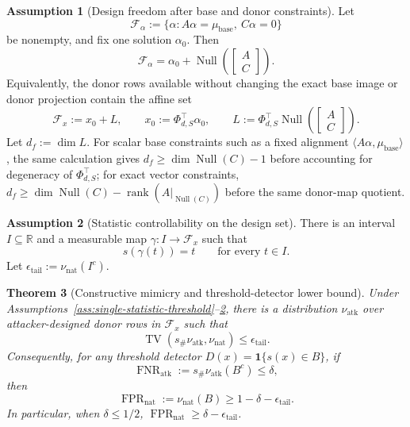 \documentclass{article}
\theoremstyle{plain}
\newtheorem{theorem}{Theorem}[section]
\theoremstyle{definition}
\newtheorem{assumption}[theorem]{Assumption}
\theoremstyle{remark}
\begin{document}
\begin{assumption}[Design freedom after base and donor constraints]
\label{ass:detector-design-freedom}
Let
\[
\mathcal{F}_{\alpha}
:=
\{\alpha:A\alpha=\mu_{\text{base}},\ C\alpha=0\}
\]
be nonempty, and fix one solution $\alpha_0$. Then
\[
\mathcal{F}_{\alpha}=\alpha_0+\operatorname{Null}\left(\begin{bmatrix}A\\ C\end{bmatrix}\right).
\]
Equivalently, the donor rows available without changing the exact base image or donor projection contain the affine set
\[
\mathcal{F}_{x}
:=
x_0+L,
\qquad
x_0:=\Phi_{d,S}^\top\alpha_0,
\qquad
L:=\Phi_{d,S}^\top\operatorname{Null}\left(\begin{bmatrix}A\\ C\end{bmatrix}\right).
\]
Let $d_f:=\dim L$. For scalar base constraints such as a fixed alignment $\langle A\alpha,\mu_{\text{base}}\rangle$, the same calculation gives $d_f\ge \dim\operatorname{Null}(C)-1$ before accounting for degeneracy of $\Phi_{d,S}^\top$; for exact vector constraints, $d_f\ge \dim\operatorname{Null}(C)-\operatorname{rank}(A|_{\operatorname{Null}(C)})$ before the same donor-map quotient.
\end{assumption}

\begin{assumption}[Statistic controllability on the design set]
\label{ass:statistic-controllability}
There is an interval $I\subseteq\mathbb{R}$ and a measurable map $\gamma:I\to\mathcal{F}_x$ such that
\[
s(\gamma(t))=t
\qquad
\text{for every }t\in I.
\]
Let $\epsilon_{\mathrm{tail}}:=\nu_{\mathrm{nat}}(I^c)$.
\end{assumption}

\begin{theorem}[Constructive mimicry and threshold-detector lower bound]
\label{thm:spectral-threshold-lower-bound}
Under Assumptions~\ref{ass:single-statistic-threshold}--\ref{ass:statistic-controllability}, there is a distribution $\nu_{\mathrm{atk}}$ over attacker-designed donor rows in $\mathcal{F}_x$ such that
\[
\operatorname{TV}\left(s_\#\nu_{\mathrm{atk}},\nu_{\mathrm{nat}}\right)
\le
\epsilon_{\mathrm{tail}}.
\]
Consequently, for any threshold detector $D(x)=\mathbf{1}\{s(x)\in B\}$, if
\[
\operatorname{FNR}_{\mathrm{atk}}:=s_\#\nu_{\mathrm{atk}}(B^c)\le \delta,
\]
then
\[
\operatorname{FPR}_{\mathrm{nat}}:=\nu_{\mathrm{nat}}(B)
\ge
1-\delta-\epsilon_{\mathrm{tail}}.
\]
In particular, when $\delta\le 1/2$, $\operatorname{FPR}_{\mathrm{nat}}\ge \delta-\epsilon_{\mathrm{tail}}$.
\end{theorem}
\end{document}

